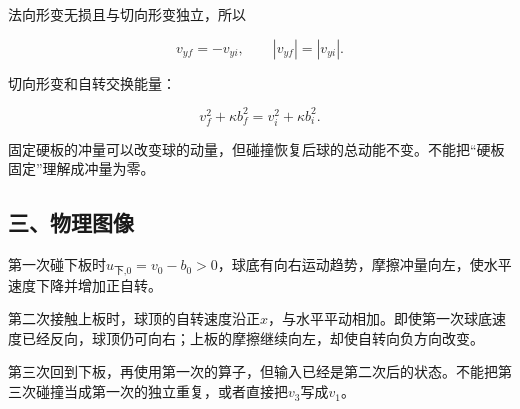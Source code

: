 \documentclass[12pt,a4paper,fontset=fandol]{ctexart}
\begin{document}
法向形变无损且与切向形变独立，所以

\[
v_{yf}=-v_{yi},\qquad |v_{yf}|=|v_{yi}|.
\]

切向形变和自转交换能量：

\[
v_f^2+\kappa b_f^2=v_i^2+\kappa b_i^2.
\]

固定硬板的冲量可以改变球的动量，但碰撞恢复后球的总动能不变。不能把``硬板固定''理解成冲量为零。

\subsection{三、物理图像}\label{ux4e09ux7269ux7406ux56feux50cf-2}

第一次碰下板时\(u_{\text{下,0}}=v_0-b_0>0\)，球底有向右运动趋势，摩擦冲量向左，使水平速度下降并增加正自转。

第二次接触上板时，球顶的自转速度沿正\(x\)，与水平平动相加。即使第一次球底速度已经反向，球顶仍可向右；上板的摩擦继续向左，却使自转向负方向改变。

\begin{center}
\begin{minipage}{\linewidth}
\centering\begingroup{}
\ifdim\wd\diagrambox>.88\linewidth
\sbox{\diagrambox}{\resizebox{.88\linewidth}{!}{\usebox{\diagrambox}}}\fi
\ifdim\ht\diagrambox>.38\textheight
\resizebox{!}{.38\textheight}{\usebox{\diagrambox}}
\else\usebox{\diagrambox}\fi
\par{}\endgroup\end{minipage}\end{center}

第三次回到下板，再使用第一次的算子，但输入已经是第二次后的状态。不能把第三次碰撞当成第一次的独立重复，或者直接把\(v_3\)写成\(v_1\)。
\end{document}
